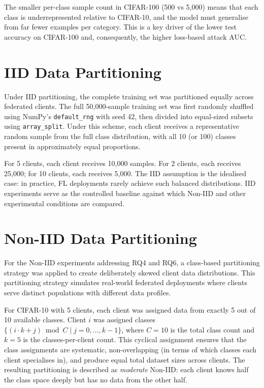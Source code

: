 \documentclass[12pt, a4paper]{report}
\begin{document}
The smaller per-class sample count in CIFAR-100 (500 vs 5,000) means that each
class is underrepresented relative to CIFAR-10, and the model must generalise
from far fewer examples per category. This is a key driver of the lower test
accuracy on CIFAR-100 and, consequently, the higher loss-based attack AUC.

\section{IID Data Partitioning}

Under IID partitioning, the complete training set was partitioned equally across
federated clients. The full 50,000-sample training set was first randomly shuffled
using NumPy's \texttt{default\_rng} with seed 42, then divided into equal-sized
subsets using \texttt{array\_split}. Under this scheme, each client receives a
representative random sample from the full class distribution, with all 10 (or
100) classes present in approximately equal proportions.

For 5 clients, each client receives 10,000 samples. For 2 clients, each receives
25,000; for 10 clients, each receives 5,000. The IID assumption is the idealised
case: in practice, FL deployments rarely achieve such balanced distributions.
IID experiments serve as the controlled baseline against which Non-IID and other
experimental conditions are compared.

\section{Non-IID Data Partitioning}

\label{sec:noniid_partitioning}

For the Non-IID experiments addressing RQ4 and RQ6, a class-based partitioning
strategy was applied to create deliberately skewed client data distributions. This
partitioning strategy simulates real-world federated deployments where clients
serve distinct populations with different data profiles.

For CIFAR-10 with 5 clients, each client was assigned data from exactly 5 out
of 10 available classes. Client $i$ was assigned classes $\{(i \cdot k + j)
\bmod C \mid j = 0, \ldots, k-1\}$, where $C = 10$ is the total class count and
$k = 5$ is the classes-per-client count. This cyclical assignment ensures that
the class assignments are systematic, non-overlapping (in terms of which classes
each client specialises in), and produce equal total dataset sizes across clients.
The resulting partitioning is described as \textit{moderate} Non-IID: each client
knows half the class space deeply but has no data from the other half.
\end{document}
